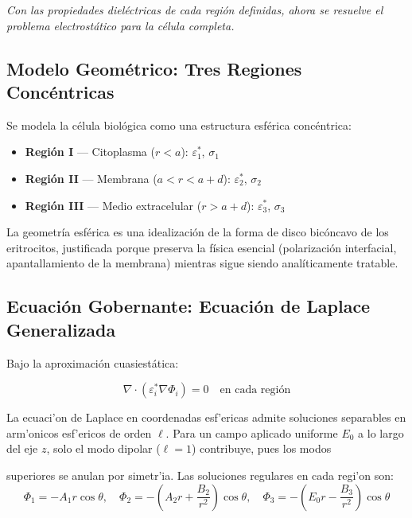 \documentclass[12pt]{article}
\begin{document}
\label{sec:cell}


\noindent\textit{Con las propiedades diel\'ectricas de cada regi\'on definidas, ahora se resuelve el
problema electrost\'atico para la c\'elula completa.}

\subsection{Modelo Geom\'etrico: Tres Regiones Conc\'entricas}

Se modela la c\'elula biol\'ogica como una estructura esf\'erica conc\'entrica:

\begin{itemize}
\item \textbf{Regi\'on I} --- Citoplasma ($r < a$): $\varepsilon_1^*$, $\sigma_1$
\item \textbf{Regi\'on II} --- Membrana ($a < r < a+d$): $\varepsilon_2^*$, $\sigma_2$
\item \textbf{Regi\'on III} --- Medio extracelular ($r > a+d$): $\varepsilon_3^*$, $\sigma_3$
\end{itemize}

La geometr\'ia esf\'erica es una idealizaci\'on de la forma de disco bic\'oncavo de los eritrocitos,
justificada porque preserva la f\'isica esencial (polarizaci\'on interfacial, apantallamiento
de la membrana) mientras sigue siendo anal\'iticamente tratable.

\subsection{Ecuaci\'on Gobernante: Ecuaci\'on de Laplace Generalizada}

Bajo la aproximaci\'on cuasiestática:

\begin{equation}
\nabla\cdot(\varepsilon_i^*\nabla\Phi_i) = 0 \quad\text{en cada regi\'on}
\end{equation}

La ecuaci'on de Laplace en coordenadas esf'ericas admite soluciones separables en
arm'onicos esf'ericos de orden $\ell$. Para un campo aplicado uniforme $E_0$ a lo
largo del eje $z$, solo el modo dipolar ($\ell = 1$) contribuye, pues los modos

superiores se anulan por simetr'ia. Las soluciones regulares en cada regi'on son:
\begin{equation}
\Phi_1 = -A_1 r\cos\theta, \quad
\Phi_2 = -\!\left(A_2 r + \frac{B_2}{r^2}\right)\!\cos\theta, \quad
\Phi_3 = -\!\left(E_0 r - \frac{B_3}{r^2}\right)\!\cos\theta
\end{equation}
\end{document}
